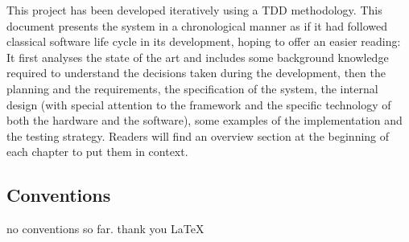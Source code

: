 This project has been developed iteratively using a \ac{TDD} methodology. 
This document presents the system in a chronological manner as if it had followed classical software life cycle in its development, hoping to offer an easier reading:
It first analyses the state of the art and includes some background knowledge required to understand the decisions taken during the development, then the planning and the requirements, the specification of the system, the internal design (with special attention to the framework and the specific technology of both the hardware and the software), some examples of the implementation and the testing strategy.
Readers will find an overview section at the beginning of each chapter to put them in context.

\subsection{Conventions}
no conventions so far. thank you \LaTeX
